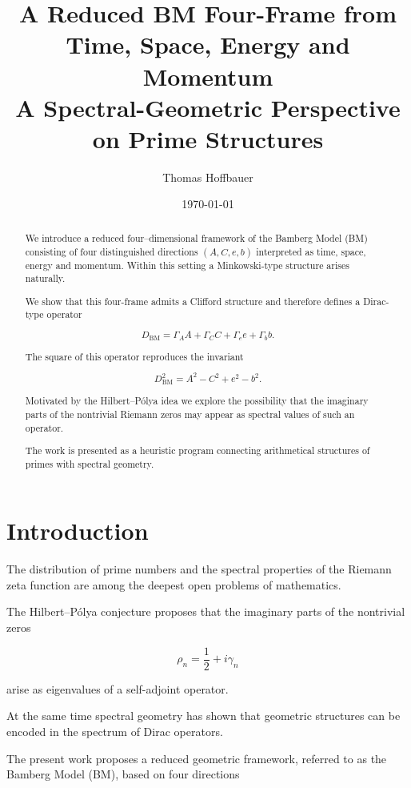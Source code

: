 \documentclass[11pt,a4paper]{article}
\title{
	A Reduced BM Four-Frame from Time, Space, Energy and Momentum\\
	\large A Spectral-Geometric Perspective on Prime Structures
}
\author{Thomas Hoffbauer}
\date{\today}
\begin{document}
	
	\maketitle
	
	\begin{abstract}
		
		We introduce a reduced four–dimensional framework of the Bamberg
		Model (BM) consisting of four distinguished directions
		$(A,C,e,b)$ interpreted as time, space, energy and momentum.
		Within this setting a Minkowski-type structure arises naturally.
		
		We show that this four-frame admits a Clifford structure and
		therefore defines a Dirac-type operator
		
		\[
		D_{\mathrm{BM}}=
		\Gamma_A A+\Gamma_C C+\Gamma_e e+\Gamma_b b .
		\]
		
		The square of this operator reproduces the invariant
		
		\[
		D_{\mathrm{BM}}^2
		=
		A^2-C^2+e^2-b^2 .
		\]
		
		Motivated by the Hilbert–Pólya idea we explore the possibility
		that the imaginary parts of the nontrivial Riemann zeros may
		appear as spectral values of such an operator.
		
		The work is presented as a heuristic program connecting
		arithmetical structures of primes with spectral geometry.
		
	\end{abstract}
	
	\tableofcontents
	
	\section{Introduction}
	
	The distribution of prime numbers and the spectral properties
	of the Riemann zeta function are among the deepest open problems
	of mathematics.
	
	The Hilbert–Pólya conjecture proposes that the imaginary parts
	of the nontrivial zeros
	
	\[
	\rho_n = \frac12 + i\gamma_n
	\]
	
	arise as eigenvalues of a self-adjoint operator.
	
	At the same time spectral geometry has shown that geometric
	structures can be encoded in the spectrum of Dirac operators.
	
	The present work proposes a reduced geometric framework,
	referred to as the Bamberg Model (BM), based on four directions
	
\end{document}
